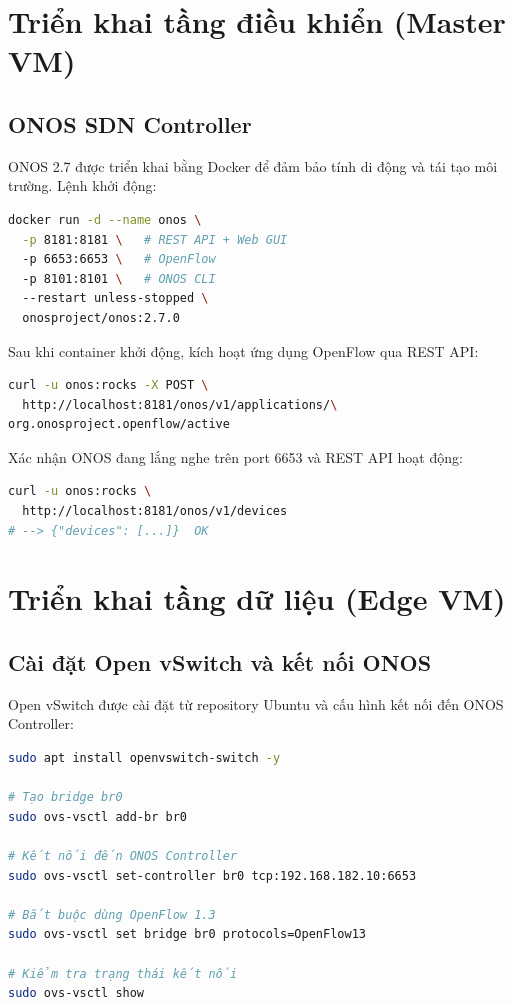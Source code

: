 \section{Triển khai tầng điều khiển (Master VM)}

\subsection{ONOS SDN Controller}

ONOS 2.7 được triển khai bằng Docker để đảm bảo tính di động và tái tạo môi trường. Lệnh khởi động:

\begin{lstlisting}[language=bash, caption={Khởi động ONOS SDN Controller qua Docker}]
docker run -d --name onos \
  -p 8181:8181 \   # REST API + Web GUI
  -p 6653:6653 \   # OpenFlow
  -p 8101:8101 \   # ONOS CLI
  --restart unless-stopped \
  onosproject/onos:2.7.0
\end{lstlisting}

Sau khi container khởi động, kích hoạt ứng dụng OpenFlow qua REST API:

\begin{lstlisting}[language=bash, caption={Kích hoạt ứng dụng OpenFlow trên ONOS}]
curl -u onos:rocks -X POST \
  http://localhost:8181/onos/v1/applications/\
org.onosproject.openflow/active
\end{lstlisting}

Xác nhận ONOS đang lắng nghe trên port 6653 và REST API hoạt động:
\begin{lstlisting}[language=bash]
curl -u onos:rocks \
  http://localhost:8181/onos/v1/devices
# --> {"devices": [...]}  OK
\end{lstlisting}

\section{Triển khai tầng dữ liệu (Edge VM)}

\subsection{Cài đặt Open vSwitch và kết nối ONOS}

Open vSwitch được cài đặt từ repository Ubuntu và cấu hình kết nối đến ONOS Controller:

\begin{lstlisting}[language=bash, caption={Cài đặt và cấu hình Open vSwitch}]
sudo apt install openvswitch-switch -y

# Tạo bridge br0
sudo ovs-vsctl add-br br0

# Kết nối đến ONOS Controller
sudo ovs-vsctl set-controller br0 tcp:192.168.182.10:6653

# Bắt buộc dùng OpenFlow 1.3
sudo ovs-vsctl set bridge br0 protocols=OpenFlow13

# Kiểm tra trạng thái kết nối
sudo ovs-vsctl show
\end{lstlisting}

